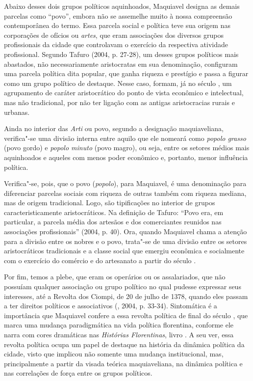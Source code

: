 Abaixo desses dois grupos políticos aquinhoados, Maquiavel designa as
demais parcelas como ``povo'', embora não se assemelhe muito à nossa
compreensão contemporânea do termo. Essa parcela social e política teve
sua origem nas corporações de ofícios ou \emph{artes}, que eram
associações dos diversos grupos profissionais da cidade que controlavam
o exercício da respectiva atividade profissional. Segundo Tafuro (2004,
p. 27-28), um desses grupos políticos mais abastados, não
necessariamente aristocratas em sua denominação, configuram uma parcela
política dita popular, que ganha riqueza e prestígio e passa a figurar
como um grupo político de destaque. Nesse caso, formam, já no século ,
um agrupamento de caráter aristocrático do ponto de vista econômico e
intelectual, mas não tradicional, por não ter ligação com as antigas
aristocracias rurais e urbanas.

Ainda no interior das \emph{Arti} ou povo, segundo a designação
maquiaveliana, verifica"-se uma divisão interna entre aquilo que ele
nomeará como \emph{popolo grasso} (povo gordo) e \emph{popolo minuto}
(povo magro), ou seja, entre os setores médios mais aquinhoados e
aqueles com menos poder econômico e, portanto, menor influência
política.

Verifica"-se, pois, que o povo (\emph{popolo}), para Maquiavel, é uma
denominação para diferenciar parcelas sociais com riqueza de outras
também com riqueza mediana, mas de origem tradicional. Logo, são
tipificações no interior de grupos caracteristicamente aristocráticos.
Na definição de Tafuro: ``Povo era, em particular, a parcela média dos
artesãos e dos comerciantes reunidos nas associações profissionais''
(2004, p. 40). Ora, quando Maquiavel chama a atenção para a divisão
entre os nobres e o povo, trata"-se de uma divisão entre os setores
aristocráticos tradicionais e a classe social que emergiu econômica e
socialmente com o exercício do comércio e do artesanato a partir do
século .

Por fim, temos a plebe, que eram os operários ou os assalariados, que
não possuíam qualquer associação ou grupo político no qual pudesse
expressar seus interesses, até a Revolta dos Ciompi, de 20 de julho de
1378, quando eles passam a ter direitos políticos e associativos
(, 2004, p. 33-34). Sintomática é a importância que Maquiavel
confere a essa revolta política de final do século , que marca uma
mudança paradigmática na vida política florentina, conforme ele narra
com cores dramáticas nas \emph{Histórias Florentinas}, livro . A seu
ver, essa revolta política ocupa um papel de destaque na história da
dinâmica política da cidade, visto que implicou não somente uma mudança
institucional, mas, principalmente a partir da visada teórica
maquiaveliana, na dinâmica política e nas correlações de força entre os
grupos políticos.

